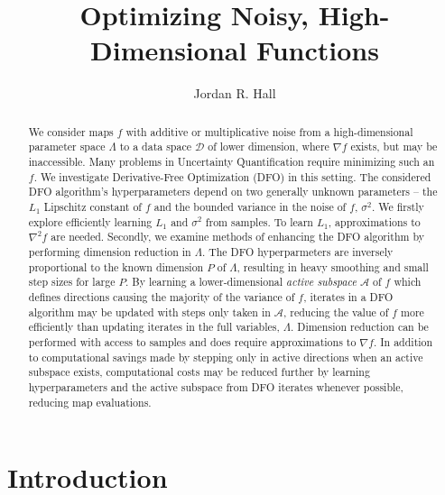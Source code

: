\documentclass{amsart}
\begin{document}
\begin{abstract}

  
We consider maps $f$ with additive or multiplicative noise from a high-dimensional parameter space $\Lambda$ to a data space $\mathcal{D}$ of lower dimension, where $\nabla f$ exists, but may be inaccessible. Many problems in Uncertainty Quantification require minimizing such an $f$. We investigate Derivative-Free Optimization (DFO) in this setting. The considered DFO algorithm's hyperparameters depend on two generally unknown parameters -- the $L_1$ Lipschitz constant of $f$ and the bounded variance in the noise of $f$, $\sigma^2$. We firstly explore efficiently learning $L_1$ and $\sigma^2$ from samples. To learn $L_1$, approximations to $\nabla^2 f$ are needed. 
Secondly, we examine methods of enhancing the DFO algorithm by performing dimension reduction in $\Lambda$.  
The DFO hyperparmeters are inversely proportional to the known dimension $P$ of $\Lambda$, resulting in heavy smoothing and small step sizes for large $P$.
By learning a lower-dimensional \textit{active subspace} $\mathcal{A}$ of $f$ which defines directions causing the majority of the variance of $f$, iterates in a DFO algorithm may be updated with steps only taken in $\mathcal{A}$, reducing the value of $f$ more efficiently than updating iterates in the full variables, $\Lambda$. 
Dimension reduction can be performed with access to samples  and does require approximations to $\nabla f$. In addition to computational savings made by stepping only in active directions when an active subspace exists, computational costs may be reduced further by learning hyperparameters and the active subspace from DFO iterates whenever possible, reducing map evaluations.

 

\end{abstract}


\title{Optimizing Noisy, High-Dimensional Functions}

\author{Jordan R. Hall}

\maketitle


\setcounter{tocdepth}{1} 
\tableofcontents






\newpage


\section{Introduction}
\end{document}
